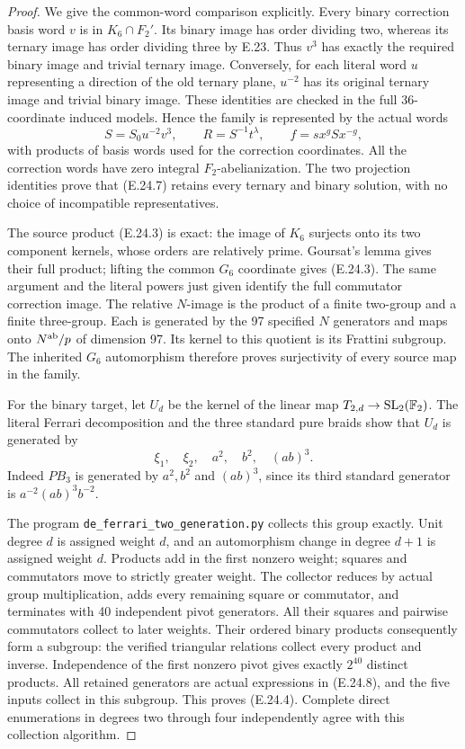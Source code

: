 \begin{proof}
We give the common-word
comparison explicitly.
Every binary correction
basis word $v$ is in
$K_6\cap F_2'$. Its
binary image has order
dividing two, whereas
its ternary image has
order dividing three
by E.23. Thus $v^3$
has exactly the required
binary image and trivial
ternary image. Conversely,
for each literal word
$u$ representing a
direction of the old
ternary plane, $u^{-2}$
has its original ternary
image and trivial binary
image. These identities
are checked in the
full 36-coordinate
induced models. Hence
the family is represented
by the actual words
\[
 S=S_0u^{-2}v^3,
 \qquad R=S^{-1}t^\lambda,
 \qquad f=sx^gSx^{-g},
 \tag{E.24.7}
\]
with products of basis
words used for the
correction coordinates.
All the correction
words have zero integral
$F_2$-abelianization.
The two projection
identities prove that
(E.24.7) retains every
ternary and binary
solution, with no
choice of incompatible
representatives.

The source product
(E.24.3) is exact:
the image of $K_6$
surjects onto its
two component kernels,
whose orders are
relatively prime.
Goursat's lemma gives
their full product;
lifting the common
$G_6$ coordinate gives
(E.24.3). The same
argument and the
literal powers just
given identify the
full commutator
correction image.
The relative $N$-image
is the product of a
finite two-group and
a finite three-group.
Each is generated
by the 97 specified
$N$ generators and
maps onto $N^{\rm ab}/p$
of dimension 97.
Its kernel to this
quotient is its
Frattini subgroup.
The inherited $G_6$
automorphism therefore
proves surjectivity
of every source map
in the family.

For the binary target,
let $U_d$ be the
kernel of the linear
map $T_{2,d}\to
\mathrm{SL}_2(\mathbb F_2)$.
The literal Ferrari
decomposition and the
three standard pure
braids show that
$U_d$ is generated by
\[
 \xi_1,\quad\xi_2,\quad
 a^2,\quad b^2,\quad(ab)^3.
 \tag{E.24.8}
\]
Indeed $PB_3$ is
generated by $a^2,b^2$
and $(ab)^3$, since
its third standard
generator is
$a^{-2}(ab)^3b^{-2}$.

The program
\texttt{de\_ferrari\_two\_generation.py}
collects this group
exactly. Unit degree
$d$ is assigned weight
$d$, and an automorphism
change in degree $d+1$
is assigned weight
$d$. Products add in
the first nonzero
weight; squares and
commutators move to
strictly greater
weight. The collector
reduces by actual
group multiplication,
adds every remaining
square or commutator,
and terminates with
40 independent pivot
generators. All their
squares and pairwise
commutators collect
to later weights.
Their ordered binary
products consequently
form a subgroup:
the verified triangular
relations collect every
product and inverse.
Independence of the
first nonzero pivot
gives exactly $2^{40}$
distinct products.
All retained generators
are actual expressions
in (E.24.8), and the
five inputs collect
in this subgroup.
This proves (E.24.4).
Complete direct
enumerations in degrees
two through four
independently agree
with this collection
algorithm.


\end{proof}
